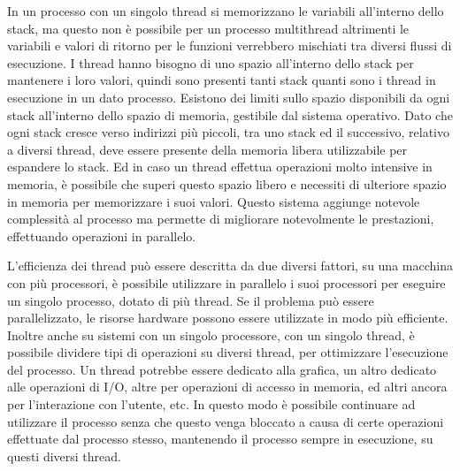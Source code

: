 \documentclass{article}
\numberwithin{equation}{subsection}
\begin{document}
In un processo con un singolo thread si memorizzano le variabili all'interno dello stack, ma questo non è possibile per un processo multithread altrimenti le variabili e valori di ritorno per 
le funzioni verrebbero mischiati tra diversi flussi di esecuzione. 
I thread hanno bisogno di uno spazio all'interno dello stack per mantenere i loro valori, quindi sono presenti tanti stack quanti sono i thread in esecuzione in un dato 
processo. 
Esistono dei limiti sullo spazio disponibili da ogni stack all'interno dello spazio di memoria, gestibile dal sistema operativo. Dato che ogni stack cresce verso indirizzi più piccoli, tra uno 
stack ed il successivo, relativo a diversi thread, deve essere presente della memoria libera utilizzabile per espandere lo stack. Ed in caso un thread effettua operazioni molto intensive in 
memoria, è possibile che superi questo spazio libero e necessiti di ulteriore spazio in memoria per memorizzare i suoi valori. 
Questo sistema aggiunge notevole complessità al processo ma permette di migliorare notevolmente le prestazioni, effettuando operazioni in parallelo. 

L'efficienza dei thread può essere descritta da due diversi fattori, su una macchina con più processori, è possibile utilizzare in parallelo i suoi processori per eseguire un singolo processo, 
dotato di più thread. Se il problema può essere parallelizzato, le risorse hardware possono essere utilizzate in modo più efficiente. Inoltre anche su sistemi con un singolo processore, 
con un singolo thread, è possibile dividere tipi di operazioni su diversi thread, per ottimizzare l'esecuzione del processo. Un thread potrebbe essere dedicato alla grafica, un altro dedicato 
alle operazioni di I/O, altre per operazioni di accesso in memoria, ed altri ancora per l'interazione con l'utente, etc. In questo modo è possibile continuare ad utilizzare il processo senza che questo 
venga bloccato a causa di certe operazioni effettuate dal processo stesso, mantenendo il processo sempre in esecuzione, su questi diversi thread. 
\end{document}
